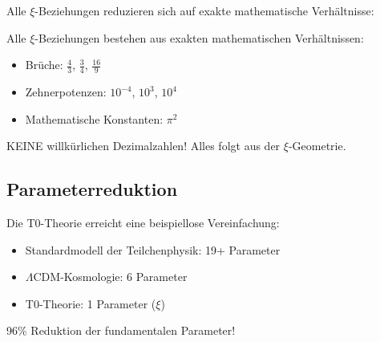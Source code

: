 	Alle $\xi$-Beziehungen reduzieren sich auf exakte mathematische Verhältnisse:
	
	\begin{table}[htbp]
		\centering
		\caption{Dimensionslose $\xi$-Verhältnisse in der T0-Theorie}
	\end{table}
	
	\begin{important}
		Alle $\xi$-Beziehungen bestehen aus exakten mathematischen Verhältnissen:
		\begin{itemize}
			\item Brüche: $\frac{4}{3}$, $\frac{3}{4}$, $\frac{16}{9}$
			\item Zehnerpotenzen: $10^{-4}$, $10^3$, $10^4$
			\item Mathematische Konstanten: $\pi^2$
		\end{itemize}
		KEINE willkürlichen Dezimalzahlen! Alles folgt aus der $\xi$-Geometrie.
	\end{important}
	
	\subsection{Parameterreduktion}
	
	\begin{revolutionary}
		Die T0-Theorie erreicht eine beispiellose Vereinfachung:
		\begin{itemize}
			\item Standardmodell der Teilchenphysik: 19+ Parameter
			\item $\Lambda$CDM-Kosmologie: 6 Parameter
			\item T0-Theorie: 1 Parameter ($\xi$)
		\end{itemize}
		96\% Reduktion der fundamentalen Parameter!
	\end{revolutionary}
	
